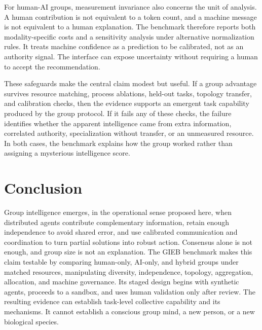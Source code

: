 \documentclass[conference]{IEEEtran}
\begin{document}
For human-AI groups, measurement invariance also concerns the unit of analysis. A human contribution is not equivalent to a token count, and a machine message is not equivalent to a human explanation. The benchmark therefore reports both modality-specific costs and a sensitivity analysis under alternative normalization rules. It treats machine confidence as a prediction to be calibrated, not as an authority signal. The interface can expose uncertainty without requiring a human to accept the recommendation.

These safeguards make the central claim modest but useful. If a group advantage survives resource matching, process ablations, held-out tasks, topology transfer, and calibration checks, then the evidence supports an emergent task capability produced by the group protocol. If it fails any of these checks, the failure identifies whether the apparent intelligence came from extra information, correlated authority, specialization without transfer, or an unmeasured resource. In both cases, the benchmark explains how the group worked rather than assigning a mysterious intelligence score.

\section{Conclusion}

Group intelligence emerges, in the operational sense proposed here, when distributed agents contribute complementary information, retain enough independence to avoid shared error, and use calibrated communication and coordination to turn partial solutions into robust action. Consensus alone is not enough, and group size is not an explanation. The GIEB benchmark makes this claim testable by comparing human-only, AI-only, and hybrid groups under matched resources, manipulating diversity, independence, topology, aggregation, allocation, and machine governance. Its staged design begins with synthetic agents, proceeds to a sandbox, and uses human validation only after review. The resulting evidence can establish task-level collective capability and its mechanisms. It cannot establish a conscious group mind, a new person, or a new biological species.
\end{document}
